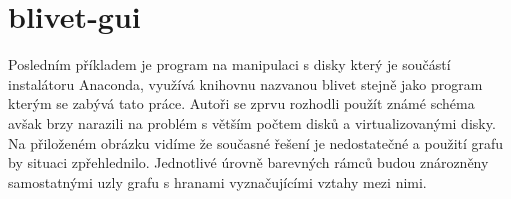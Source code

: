 \documentclass{article}
\begin{document}
\section{blivet-gui}

Posledním příkladem je program na manipulaci s disky který je součástí instalátoru Anaconda, využívá knihovnu nazvanou blivet stejně jako program kterým se zabývá tato práce. Autoři se zprvu rozhodli použít známé schéma avšak brzy narazili na problém s větším počtem disků a virtualizovanými disky. Na přiloženém obrázku vidíme že současné řešení je nedostatečné a použití grafu by
situaci zpřehlednilo. Jednotlivé úrovně barevných rámců budou znározněny samostatnými uzly grafu s hranami vyznačujícími vztahy mezi nimi. 
\end{document}
